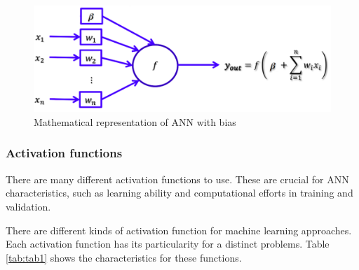 \begin{figure}[H]
\centering
\includegraphics[width=\columnwidth]{imagens/math_ann_bias.png}
\caption{Mathematical representation of ANN with bias \cite{lecture}}
\label{fig:ann_weight}
\end{figure}


\subsubsection{Activation functions}
There are many different activation functions to use. These are crucial for ANN characteristics, such as learning ability and computational efforts in training and validation.

There are different kinds of activation function for machine learning approaches. Each activation function has its particularity for a distinct problems. Table \ref{tab:tab1} shows the characteristics for these functions. 


